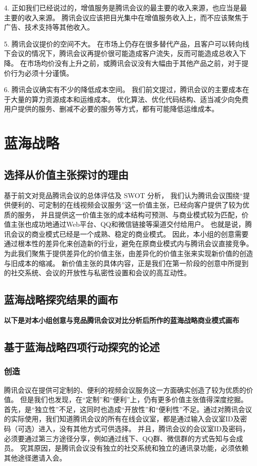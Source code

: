 \documentclass[a4paper,12pt]{article}
\begin{document}
    4.
    正如我们已经说过的，增值服务是腾讯会议的最主要的收入来源，也应当是最主要的收入来源。
    腾讯会议应该把目光集中在增值服务收入上，而不应该聚焦于广告、技术支持等其他收入。


    5.
    腾讯会议提价的空间不大。
    在市场上仍存在很多替代产品，且客户可以转向线下会议的情况下，腾讯会议再提价很可能造成客户流失，反而可能造成总收入下降。
    在市场均价没有上升之前，或腾讯会议没有大幅由于其他产品之前，对于提价行为必须十分谨慎。

    6.
    腾讯会议确实有不少的降低成本空间。
    我们前文提过，腾讯会议的主要成本在于大量的算力资源成本和运维成本。
    优化算法、优化代码结构、适当减少向免费用户提供的服务、删减不必要的服务等方式，都有可能降低运维成本。

    
    \section{蓝海战略}

    
    \subsection{选择从价值主张探讨的理由}
    基于前文对竞品腾讯会议的总体评估及 SWOT 分析，
    我们认为腾讯会议围绕“提供便利的、可定制的在线视频会议服务”这一价值主张，已经向客户提供了较为优质的服务，
    并且提供这一价值主张的成本结构可预测、与商业模式较为匹配，价值主张也成功地通过Web平台、QQ和微信链接等渠道交付给用户。
    也就是说，腾讯会议的商业模式已经是一个成熟、稳定的商业模式。
    因此，本小组的创意需要通过根本性的差异化来创造新的行业，避免在原商业模式内与腾讯会议直接竞争。
    为此我们聚焦于提供差异化的价值主张，由差异化的价值主张来实现新价值的创造与旧成本的缩减。
    新价值主张的具体内容，正是我们在第一阶段的创意中所提到的社交系统、会议的开放性与私密性设置和会议的高互动性。
    
    \subsection{蓝海战略探究结果的画布}
    \textbf{以下是对本小组创意与竞品腾讯会议对比分析后所作的蓝海战略商业模式画布}

    \subsection{基于蓝海战略四项行动探究的论述}
    \subsubsection{创造}
    腾讯会议在提供可定制的、便利的视频会议服务这一方面确实创造了较为优质的价值。
    但是我们也发现，在“定制”和“便利”上，仍有更多价值主张值得深度挖掘。
    首先，是“独立性”不足，这同时也造成“开放性”和“便利性”不足。通过对腾讯会议的实际使用，我们知道腾讯会议的所有在线会议室，都是通过输入会议室ID及密码（可选）进入，没有其他方式可供选择。
    并且，腾讯会议的会议室ID及密码，必须要通过第三方途径分享，例如通过线下、QQ群、微信群的方式告知与会成员。
    究其原因，是腾讯会议没有独立的社交系统和独立的通讯录功能，必须依赖其他途径邀请入会。
\end{document}
